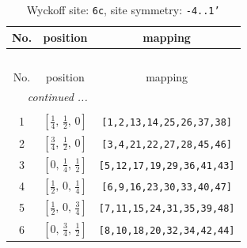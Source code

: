 \documentclass[fleqn,8pt]{jsarticle}
\begin{document}
\renewcommand{\arraystretch}{1.2}
\begin{longtable}{ccc}
\caption{Wyckoff site: {\tt 6c}, site symmetry: {\tt -4..1'}}
 \\
 \hline \hline
No. & position & mapping \\ \hline \endfirsthead

\multicolumn{2}{l}{\tablename\ \thetable{}} \\
 \hline \hline
No. & position & mapping \\ \hline \endhead

 \hline \hline
\multicolumn{2}{r}{\footnotesize\it continued ...} \\ \endfoot

 \hline \hline
\multicolumn{2}{r}{} \\ \endlastfoot

1 & $\left[ \frac{1}{4},\, \frac{1}{2},\, 0 \right]$ & {\tt [1,2,13,14,25,26,37,38]} \\ \hline
2 & $\left[ \frac{3}{4},\, \frac{1}{2},\, 0 \right]$ & {\tt [3,4,21,22,27,28,45,46]} \\ \hline
3 & $\left[ 0,\, \frac{1}{4},\, \frac{1}{2} \right]$ & {\tt [5,12,17,19,29,36,41,43]} \\ \hline
4 & $\left[ \frac{1}{2},\, 0,\, \frac{1}{4} \right]$ & {\tt [6,9,16,23,30,33,40,47]} \\ \hline
5 & $\left[ \frac{1}{2},\, 0,\, \frac{3}{4} \right]$ & {\tt [7,11,15,24,31,35,39,48]} \\ \hline
6 & $\left[ 0,\, \frac{3}{4},\, \frac{1}{2} \right]$ & {\tt [8,10,18,20,32,34,42,44]} \\
\end{longtable}
\renewcommand{\arraystretch}{1.2}
\end{document}
